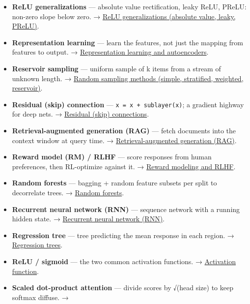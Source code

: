\documentclass[
  10pt,
  letterpaper,
  onecolumn]{article}
\begin{document}
\begin{itemize}
  reward signal, with no labeled targets. →
  \protect\hyperlink{reinforcement-learning}{Reinforcement learning}.
\item
  \textbf{ReLU generalizations} --- absolute value rectification, leaky
  ReLU, PReLU: non-zero slope below zero. →
  \protect\hyperlink{relu-generalizations-absolute-value-leaky-prelu}{ReLU
  generalizations (absolute value, leaky, PReLU)}.
\item
  \textbf{Representation learning} --- learn the features, not just the
  mapping from features to output. →
  \protect\hyperlink{representation-learning-and-autoencoders}{Representation
  learning and autoencoders}.
\item
  \textbf{Reservoir sampling} --- uniform sample of k items from a
  stream of unknown length. →
  \protect\hyperlink{random-sampling-methods-simple-stratified-weighted-reservoir}{Random
  sampling methods (simple, stratified, weighted, reservoir)}.
\item
  \textbf{Residual (skip) connection} ---
  \texttt{x\ =\ x\ +\ sublayer(x)}; a gradient highway for deep nets. →
  \protect\hyperlink{residual-skip-connections}{Residual (skip)
  connections}.
\item
  \textbf{Retrieval-augmented generation (RAG)} --- fetch documents into
  the context window at query time. →
  \protect\hyperlink{retrieval-augmented-generation-rag}{Retrieval-augmented
  generation (RAG)}.
\item
  \textbf{Reward model (RM) / RLHF} --- score responses from human
  preferences, then RL-optimize against it. →
  \protect\hyperlink{reward-modeling-and-rlhf}{Reward modeling and
  RLHF}.
\item
  \textbf{Random forests} --- bagging + random feature subsets per split
  to decorrelate trees. → \protect\hyperlink{random-forests}{Random
  forests}.
\item
  \textbf{Recurrent neural network (RNN)} --- sequence network with a
  running hidden state. →
  \protect\hyperlink{recurrent-neural-network-rnn}{Recurrent neural
  network (RNN)}.
\item
  \textbf{Regression tree} --- tree predicting the mean response in each
  region. → \protect\hyperlink{regression-trees}{Regression trees}.
\item
  \textbf{ReLU / sigmoid} --- the two common activation functions. →
  \protect\hyperlink{activation-function}{Activation function}.
\item
  \textbf{Scaled dot-product attention} --- divide scores by √(head
  size) to keep softmax diffuse. →

\end{itemize}
\end{document}
